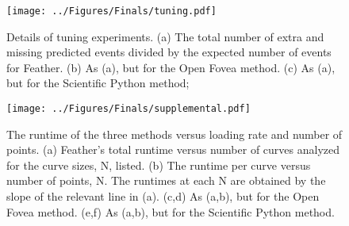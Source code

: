\documentclass[%
  aip,12pt,tightenlines,
  amsthm,
 amsmath,amssymb
]{article}
\newcommand{\fLabel}[1]{\label{figure:#1}}
\newcommand{\pEndF}[0]{ \\ }
\newcommand{\pStartF}[0]{ }
\newcommand{\name}[0]{Feather}
\newcommand{\figwidth}[0]{\linewidth}
\begin{document}
\begin{figure}
\centering
\texttt{[image: ../Figures/Finals/tuning.pdf]}%
\caption[Cross validation of algorithms and optimal parameters]{\noindent\fLabel{Tuning}\pStartF Details of tuning experiments. (a) The total number of extra and missing predicted events divided by the expected number of events for \name{}. (b) As (a), but for the Open Fovea method. (c) As (a), but for the Scientific Python method; \pEndF }
\end{figure}



\begin{figure}
\centering
\texttt{[image: ../Figures/Finals/supplemental.pdf]}%
\caption[Algorithmic runtime versus loading rate]{\noindent\fLabel{Timing_Details}\pStartF The runtime of the three methods versus loading rate and number of points. (a) \name{}'s total runtime versus number of curves analyzed for the curve sizes, N, listed. (b) The runtime per curve versus number of points, N. The runtimes at each N are obtained by the slope of the relevant line in (a).  (c,d) As (a,b), but for the Open Fovea method. (e,f) As (a,b), but for the Scientific Python method. \pEndF }
\end{figure}
\end{document}
